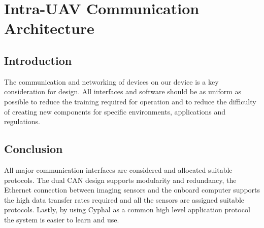 \newpage
{}
\section{Intra-UAV Communication Architecture} \label{Intra Communication}

\subsection{Introduction}\label{sub_section:tgt_intra_com_intro}
The communication and networking of devices on our device is a key consideration for design. All interfaces and software should be as uniform as possible to reduce the training required for operation and to reduce the difficulty of creating new components for specific environments, applications and regulations.



\subsection{Conclusion}
All major communication interfaces are considered and allocated suitable protocols. The dual \gls{CAN} design supports modularity and redundancy, the Ethernet connection between imaging sensors and the onboard computer supports the high data transfer rates required and all the sensors are assigned suitable protocols. Lastly, by using Cyphal as a common high level application protocol the system is easier to learn and use.